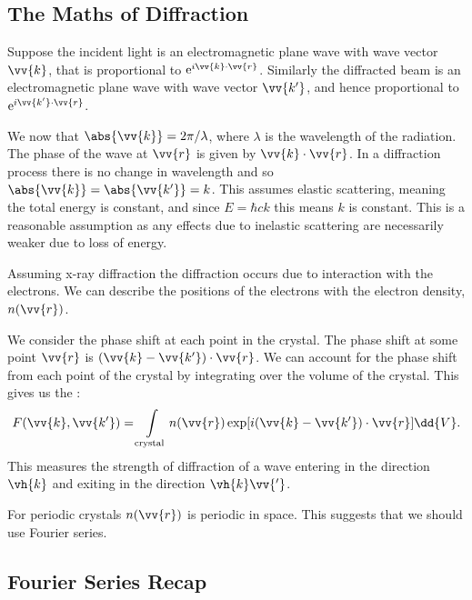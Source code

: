 \documentclass[fleqn]{NotesClass}
\newcommand*{\e}{\mathrm{e}}
\begin{document}
    \subsection{The Maths of Diffraction}
    Suppose the incident light is an electromagnetic plane wave with wave vector \(\vv{k}\), that is proportional to \(\e^{i\vv{k}\cdot\vv{r}}\).
    Similarly the diffracted beam is an electromagnetic plane wave with wave vector \(\vv{k'}\), and hence proportional to \(\e^{i\vv{k'}\cdot\vv{r}}\).
    
    We now that \(\abs{\vv{k}} = 2\pi/\lambda\), where \(\lambda\) is the wavelength of the radiation.
    The phase of the wave at \(\vv{r}\) is given by \(\vv{k}\cdot\vv{r}\).
    In a diffraction process there is no change in wavelength and so \(\abs{\vv{k}} = \abs{\vv{k'}} = k\).
    This assumes elastic scattering, meaning the total energy is constant, and since \(E = \hbar c k\) this means \(k\) is constant.
    This is a reasonable assumption as any effects due to inelastic scattering are necessarily weaker due to loss of energy.
    
    Assuming x-ray diffraction the diffraction occurs due to interaction with the electrons.
    We can describe the positions of the electrons with the electron density, \(n(\vv{r})\).
    
    We consider the phase shift at each point in the crystal.
    The phase shift at some point \(\vv{r}\) is \((\vv{k} - \vv{k'})\cdot\vv{r}\).
    We can account for the phase shift from each point of the crystal by integrating over the volume of the crystal.
    This gives us the :
    \begin{equation}
        F(\vv{k}, \vv{k'}) = \int\limits_{\text{crystal}} n(\vv{r}) \exp[i (\vv{k} - \vv{k'}) \cdot \vv{r}] \dd{V}.
    \end{equation}
    This measures the strength of diffraction of a wave entering in the direction \(\vh{k}\) and exiting in the direction \(\vh{k}\vv{'}\).
    
    For periodic crystals \(n(\vv{r})\) is periodic in space.
    This suggests that we should use Fourier series.
    
    \subsection{Fourier Series Recap}
\end{document}
